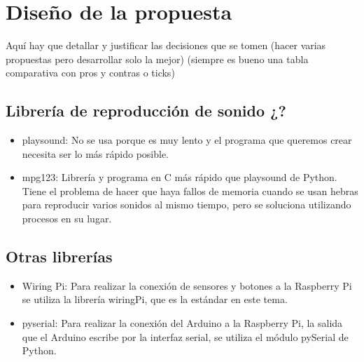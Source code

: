 \documentclass{article}
\begin{document}

\section{Diseño de la propuesta} %
\label{sec:Diseno}

    Aquí hay que detallar y justificar las decisiones que se tomen (hacer varias propuestas pero desarrollar solo la
    mejor) (siempre es bueno una tabla comparativa con pros y contras o ticks)

    \subsection{Librería de reproducción de sonido ¿?} %
    \label{sub:LibreriaDeReproduccionDeSonido}

        \begin{itemize}
            \item
            playsound\cite{playsound}: No se usa porque es muy lento y el programa que queremos crear necesita ser lo
            más rápido posible.
            \item
            mpg123\cite{mpg123}: Librería y programa en C más rápido que playsound de Python. Tiene el problema de
            hacer que haya fallos de memoria cuando se usan hebras para reproducir varios sonidos al mismo tiempo, pero
            se soluciona utilizando procesos en su lugar.
        \end{itemize}


    \subsection{Otras librerías} %
    \label{sub:OtrasLibrerias}

        \begin{itemize}
            \item
            Wiring Pi\cite{wiringPi}: Para realizar la conexión de sensores y botones a la Raspberry Pi se utiliza
            la librería wiringPi, que es la estándar en este tema.
            \item
            pyserial\cite{pyserial}: Para realizar la conexión del Arduino a la Raspberry Pi, la salida que el Arduino
            escribe por la interfaz serial, se utiliza el módulo pySerial de Python.
        \end{itemize}
\end{document}
